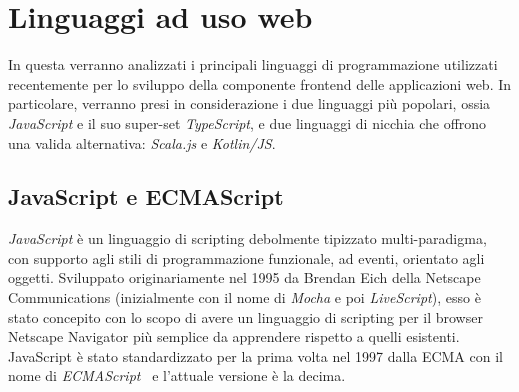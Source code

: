 
  \section{Linguaggi ad uso web}\label{sec:lang}
    In questa  verranno analizzati i principali linguaggi di programmazione utilizzati recentemente per lo sviluppo della componente frontend delle applicazioni web.
    In particolare, verranno presi in considerazione i due linguaggi più popolari, ossia \emph{JavaScript} e il suo super-set \emph{TypeScript}, e due linguaggi di nicchia che offrono una valida alternativa: \emph{Scala.js} e \emph{Kotlin/JS}\@.

    \subsection{JavaScript e ECMAScript}\label{subsec:js}


      \emph{JavaScript} è un linguaggio di scripting debolmente tipizzato multi-paradigma, con supporto agli stili di programmazione funzionale, ad eventi, orientato agli oggetti.
      Sviluppato originariamente nel 1995 da Brendan Eich della Netscape Communications (inizialmente con il nome di \emph{Mocha} e poi \emph{LiveScript}),
      esso è stato concepito con lo scopo di avere un linguaggio di scripting per il browser Netscape Navigator più semplice da apprendere rispetto a quelli esistenti.
      JavaScript è stato standardizzato per la prima volta nel 1997 dalla ECMA con il nome di \emph{ECMAScript}~\cite{ECMA-262,ISO:1998} e l'attuale versione è la decima.

